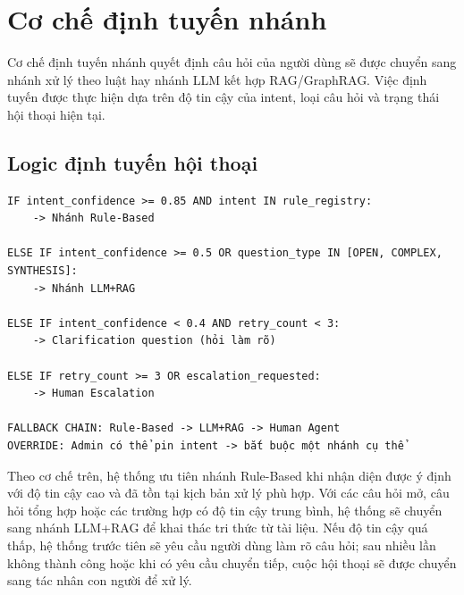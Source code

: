 \section{Cơ chế định tuyến nhánh}

Cơ chế định tuyến nhánh quyết định câu hỏi của người dùng sẽ được chuyển sang nhánh xử lý theo luật hay nhánh LLM kết hợp RAG/GraphRAG. Việc định tuyến được thực hiện dựa trên độ tin cậy của intent, loại câu hỏi và trạng thái hội thoại hiện tại.

\subsection{Logic định tuyến hội thoại}

\begin{verbatim}
IF intent_confidence >= 0.85 AND intent IN rule_registry:
    -> Nhánh Rule-Based

ELSE IF intent_confidence >= 0.5 OR question_type IN [OPEN, COMPLEX, SYNTHESIS]:
    -> Nhánh LLM+RAG

ELSE IF intent_confidence < 0.4 AND retry_count < 3:
    -> Clarification question (hỏi làm rõ)

ELSE IF retry_count >= 3 OR escalation_requested:
    -> Human Escalation

FALLBACK CHAIN: Rule-Based -> LLM+RAG -> Human Agent
OVERRIDE: Admin có thể pin intent -> bắt buộc một nhánh cụ thể
\end{verbatim}

Theo cơ chế trên, hệ thống ưu tiên nhánh Rule-Based khi nhận diện được ý định với độ tin cậy cao và đã tồn tại kịch bản xử lý phù hợp. Với các câu hỏi mở, câu hỏi tổng hợp hoặc các trường hợp có độ tin cậy trung bình, hệ thống sẽ chuyển sang nhánh LLM+RAG để khai thác tri thức từ tài liệu. Nếu độ tin cậy quá thấp, hệ thống trước tiên sẽ yêu cầu người dùng làm rõ câu hỏi; sau nhiều lần không thành công hoặc khi có yêu cầu chuyển tiếp, cuộc hội thoại sẽ được chuyển sang tác nhân con người để xử lý.
